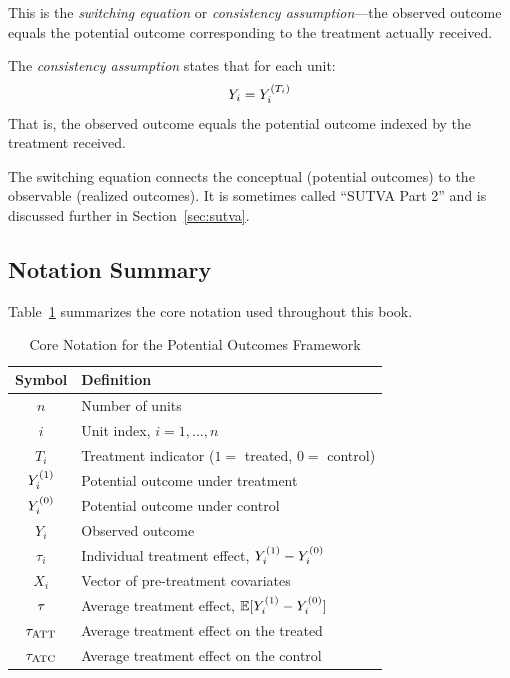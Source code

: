 This is the \emph{switching equation} or \emph{consistency assumption}---the observed outcome equals the potential outcome corresponding to the treatment actually received.

\begin{definition}[Consistency]
\label{def:consistency}
The \emph{consistency assumption} states that for each unit:
\begin{equation}
Y_i = Y^{(T_i)}_i
\end{equation}
That is, the observed outcome equals the potential outcome indexed by the treatment received.
\end{definition}

The switching equation connects the conceptual (potential outcomes) to the observable (realized outcomes). It is sometimes called ``SUTVA Part 2'' and is discussed further in Section~\ref{sec:sutva}.

\subsection{Notation Summary}

Table~\ref{tab:notation} summarizes the core notation used throughout this book.

\begin{table}[ht]
\centering
\caption{Core Notation for the Potential Outcomes Framework}
\label{tab:notation}
\begin{tabular}{cl}
\toprule
\textbf{Symbol} & \textbf{Definition} \\
\midrule
$n$ & Number of units \\
$i$ & Unit index, $i = 1, \ldots, n$ \\
$T_i$ & Treatment indicator ($1 = $ treated, $0 = $ control) \\
$Y^{(1)}_i$ & Potential outcome under treatment \\
$Y^{(0)}_i$ & Potential outcome under control \\
$Y_i$ & Observed outcome \\
$\tau_i$ & Individual treatment effect, $Y^{(1)}_i - Y^{(0)}_i$ \\
$X_i$ & Vector of pre-treatment covariates \\
$\tau$ & Average treatment effect, $\mathbb{E}[Y^{(1)}_i - Y^{(0)}_i]$ \\
$\tau_{\text{ATT}}$ & Average treatment effect on the treated \\
$\tau_{\text{ATC}}$ & Average treatment effect on the control \\
\bottomrule
\end{tabular}
\end{table}


